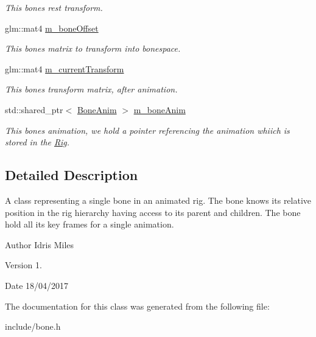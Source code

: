 \begin{DoxyCompactItemize}
\begin{DoxyCompactList}\small\item\em This bones rest transform. \end{DoxyCompactList}\item 
glm\+::mat4 \hyperlink{classBone_afb44f0a5108613343a6b4a03b0800791}{m\+\_\+bone\+Offset}\hypertarget{classBone_afb44f0a5108613343a6b4a03b0800791}{}\label{classBone_afb44f0a5108613343a6b4a03b0800791}

\begin{DoxyCompactList}\small\item\em This bones matrix to transform into bonespace. \end{DoxyCompactList}\item 
glm\+::mat4 \hyperlink{classBone_a45ed57a9660b47a42849775a4f8c7e64}{m\+\_\+current\+Transform}\hypertarget{classBone_a45ed57a9660b47a42849775a4f8c7e64}{}\label{classBone_a45ed57a9660b47a42849775a4f8c7e64}

\begin{DoxyCompactList}\small\item\em This bones transform matrix, after animation. \end{DoxyCompactList}\item 
std\+::shared\+\_\+ptr$<$ \hyperlink{structBoneAnim}{Bone\+Anim} $>$ \hyperlink{classBone_a2b79368d9a14bd038e534940a0911404}{m\+\_\+bone\+Anim}\hypertarget{classBone_a2b79368d9a14bd038e534940a0911404}{}\label{classBone_a2b79368d9a14bd038e534940a0911404}

\begin{DoxyCompactList}\small\item\em This bones animation, we hold a pointer referencing the animation whiich is stored in the \hyperlink{classRig}{Rig}. \end{DoxyCompactList}\end{DoxyCompactItemize}


\subsection{Detailed Description}
A class representing a single bone in an animated rig. The bone knows its relative position in the rig hierarchy having access to its parent and children. The bone hold all its key frames for a single animation. 

\begin{DoxyAuthor}{Author}
Idris Miles 
\end{DoxyAuthor}
\begin{DoxyVersion}{Version}
1. 
\end{DoxyVersion}
\begin{DoxyDate}{Date}
18/04/2017 
\end{DoxyDate}


The documentation for this class was generated from the following file\+:\begin{DoxyCompactItemize}
\item 
include/bone.\+h\end{DoxyCompactItemize}
